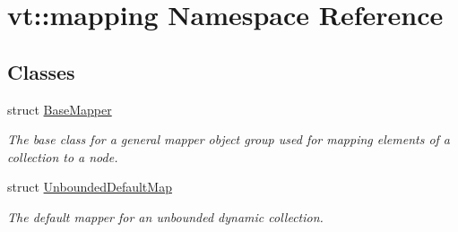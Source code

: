 \hypertarget{namespacevt_1_1mapping}{}\section{vt\+:\+:mapping Namespace Reference}
\label{namespacevt_1_1mapping}
\subsection*{Classes}
\begin{DoxyCompactItemize}
\item 
struct \hyperlink{structvt_1_1mapping_1_1_base_mapper}{Base\+Mapper}
\begin{DoxyCompactList}\small\item\em The base class for a general mapper object group used for mapping elements of a collection to a node. \end{DoxyCompactList}\item 
struct \hyperlink{structvt_1_1mapping_1_1_unbounded_default_map}{Unbounded\+Default\+Map}
\begin{DoxyCompactList}\small\item\em The default mapper for an unbounded dynamic collection. \end{DoxyCompactList}\end{DoxyCompactItemize}
